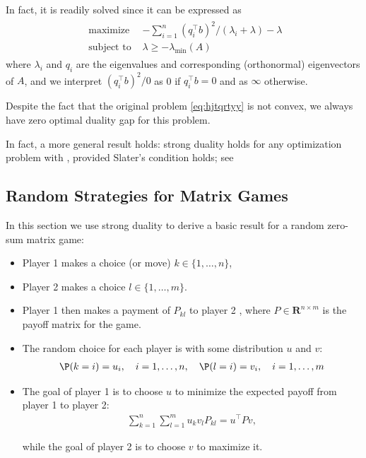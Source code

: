 \documentclass{article}
\begin{document}
In fact, it is readily solved since it can be expressed as
\begin{align*}
\begin{array}{ll}
\text { maximize } & -\sum_{i=1}^{n}\left(q_{i}^{\top} b\right)^{2} /\left(\lambda_{i}+\lambda\right)-\lambda \\
\text { subject to } & \lambda \geq-\lambda_{\min }(A)
\end{array}
\end{align*}
where $\lambda_{i}$ and $q_{i}$ are the eigenvalues and corresponding (orthonormal) eigenvectors of $A$, and we interpret $\left(q_{i}^{\top} b\right)^{2} / 0$ as 0 if $q_{i}^{\top} b=0$ and as $\infty$ otherwise.


Despite the fact that the original problem \cref{eq:hjtqrtyy} is not convex, we always have zero optimal duality gap for this problem.
\begin{rema}
In fact, a more general result holds: strong duality holds for any optimization problem with , provided Slater's condition holds; see \cite[B.1.]{boyd2004convex}
\end{rema}

\subsection{Random Strategies for Matrix Games}\label{sec:timafdf}
In this section we use strong duality to derive a basic result for a random zero-sum matrix game: 
\begin{itemize}
    \item Player 1 makes a choice (or move) $k \in\{1, \ldots, n\}$, 
    \item Player 2 makes a choice $l \in\{1, \ldots, m\} .$ 
    \item Player 1 then makes a payment of $P_{k l}$ to player 2 , where $P \in \mathbf{R}^{n \times m}$ is the payoff matrix for the game.
    \item The random choice for each player is  with some distribution $u$ and $v$:
    \begin{align*}
\P(k=i)=u_{i}, \quad i=1, \ldots, n, \quad \P(l=i)=v_{i}, \quad i=1, \ldots, m
\end{align*}
    \item The goal of player 1 is to choose $u$ to minimize the expected payoff from player 1 to player 2:
\begin{align*}
\sum_{k=1}^{n} \sum_{l=1}^{m} u_{k} v_{l} P_{k l}=u^{\top} P v,
\end{align*}
    
    while the goal of player 2 is to choose $v$ to maximize it.
\end{itemize}  
\end{document}
